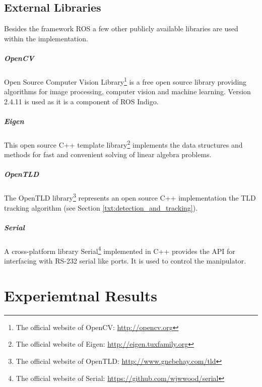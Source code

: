 	\section{External Libraries} \label{txt:external_libraries}
	
	Besides the framework ROS a few other publicly available libraries are used within the implementation.
	
	\paragraph{OpenCV} Open Source Computer Vision Library\footnote{The official website of OpenCV: \url{http://opencv.org}} is a free open source library providing algorithms for image processing, computer vision and machine learning. Version 2.4.11 is used as it is a component of ROS Indigo.
	
	\paragraph{Eigen} This open source C++ template library\footnote{The official website of Eigen: \url{http://eigen.tuxfamily.org}} implements the data structures and methods for fast and convenient solving of linear algebra problems.
	
	\paragraph{OpenTLD} The OpenTLD library\footnote{The official website of OpenTLD: \url{http://www.gnebehay.com/tld}} represents an open source C++ implementation the TLD tracking algorithm (see Section \ref{txt:detection_and_tracking}).	
	
	\paragraph{Serial} A cross-platform library Serial\footnote{The official website of Serial: \url{https://github.com/wjwwood/serial}} implemented in C++ provides the API for interfacing with RS-232 serial like ports. It is used to control the manipulator.
	
	\chapter{Experiemtnal Results}

